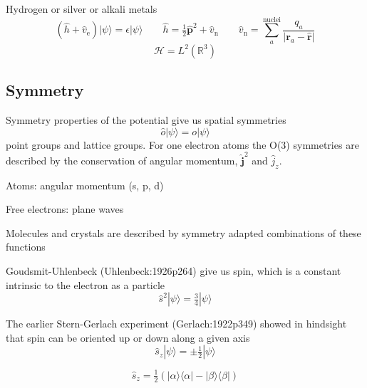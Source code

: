 \newpage
Hydrogen or silver or alkali metals
\begin{equation}
    (\hat{h} + \hat{v}_\mathrm{e})
    |\psi\rangle
    =
    \epsilon
    |\psi\rangle
    \qquad
    \hat{h}
    =
    \tfrac{1}{2}
    \hat{\mathbf{p}}^2
    +
    \hat{v}_\mathrm{n}
    \qquad
    \hat{v}_\mathrm{n}
    =
    \sum_a^{\mathrm{nuclei}}
    \frac{q_a}{|\mathbf{r}_a-\hat{\mathbf{r}}|}
\end{equation}
\begin{equation}
    \mathcal{H}
    =
    L^2(\mathbb{R}^3)
\end{equation}

\subsection{Symmetry}

Symmetry properties of the potential give us spatial symmetries
\begin{equation}
    \hat{o}
    |\psi\rangle
    =
    o
    |\psi\rangle
\end{equation}
point groups and lattice groups.
For one electron atoms the O(3) symmetries are described by the conservation of
angular momentum, \(\hat{\mathbf{j}}^2\) and \(\hat{j}_z\).

\noindent
Atoms: angular momentum (s, p, d)

\noindent
Free electrons: plane waves

\noindent
Molecules and crystals are described by symmetry adapted combinations of these
functions


Goudsmit-Uhlenbeck (Uhlenbeck:1926p264) give us spin, which is a constant intrinsic to the electron
as a particle
\begin{equation}
    \hat{s}^2
    |\psi\rangle
    =
    \tfrac{3}{4}
    |\psi\rangle
\end{equation}

The earlier Stern-Gerlach experiment (Gerlach:1922p349) showed in hindsight that
spin can be oriented up or down along a given axis
\begin{equation}
    \hat{s}_z
    |\psi\rangle
    =
    \pm
    \tfrac{1}{2}
    |\psi\rangle
\end{equation}

\begin{equation}
    \hat{s}_z
    =
    \tfrac{1}{2}
    (
        |\alpha\rangle\langle\alpha|
        -
        |\beta\rangle\langle\beta|
    )
\end{equation}


